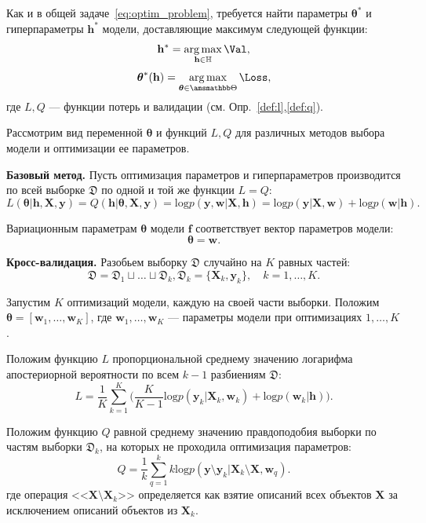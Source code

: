 Как и в общей задаче~\eqref{eq:optim_problem}, 
требуется найти параметры ${\boldsymbol{\theta}}^{*}$ и гиперпараметры $\mathbf{h}^{*}$ модели, доставляющие максимум следующей функции:
\begin{equation}
\label{eq:main}
    \mathbf{h}^{*} = \argmax_{\mathbf{h} \in \mathbb{H}} \Val,
\end{equation}
\begin{equation}
\label{eq:main2}
	\boldsymbol{\theta}^{*}(\mathbf{h}) =  \argmax_{\boldsymbol{\theta} \in \Tetab} \Loss,
\end{equation}
где $L,Q$ --- функции потерь и валидации (см. Опр.~\ref{def:l},\ref{def:q}).

Рассмотрим вид переменной $\boldsymbol{\theta}$ и функций $L, Q$ для различных методов выбора модели и оптимизации ее параметров.

\textbf{Базовый метод. }
Пусть оптимизация параметров и гиперпараметров производится по всей выборке $\mathfrak{D}$ по одной и той же функции $L=Q$:
$$L(\boldsymbol{\theta}|  \mathbf{h},  \mathbf{X}, \mathbf{y}) = Q(\mathbf{h}|  \boldsymbol{\theta}, \mathbf{X}, \mathbf{y} ) = \text{log}p(\mathbf{y}, \mathbf{w} | \mathbf{X}, \mathbf{h}) = \text{log} p(\mathbf{y}|\mathbf{X}, \mathbf{w})+\text{log}p(\mathbf{w}|\mathbf{h}).$$

Вариационным параметрам $\boldsymbol{\theta}$ модели $\mathbf{f}$  соответствует вектор параметров модели: 
\[
\boldsymbol{\theta} = \mathbf{w}.
\]

\textbf{Кросс-валидация. }
Разобьем выборку $\mathfrak{D}$ случайно на $K$ равных частей:
\[
\mathfrak{D} = \mathfrak{D}_1 \sqcup \dots \sqcup \mathfrak{D}_k, \mathfrak{D}_k = \{\mathbf{X}_k, \mathbf{y}_k\}, \quad k=1,\dots,K.
\]


Запустим $K$ оптимизаций модели, каждую на своей части выборки. Положим $\boldsymbol{\theta} = [\mathbf{w}_1, \dots, \mathbf{w}_K]$, где $\mathbf{w}_1, \dots, \mathbf{w}_K$ --- параметры модели при оптимизациях $1, \dots, K$.
 
Положим функцию $L$ пропорциональной  среднему значению логарифма апостериорной вероятности по всем $k-1$ разбиениям $\mathfrak{D}$:
\begin{equation}
L = \frac{1}{K}\sum_{k=1}^K \bigl(\frac{K}{K-1}\text{log}p(\mathbf{y}_k|\mathbf{X}_k, \mathbf{w}_k) + \text{log}p(\mathbf{w}_k|\mathbf{h})\bigr).
\label{eq:cv}
\end{equation}

Положим функцию $Q$ равной среднему значению правдоподобия выборки по частям выборки $\mathfrak{D}_k$, на которых не проходила оптимизация параметров:
\[
Q = \frac{1}{k}\sum_{q=1}^k k\text{log}p(\mathbf{y} \setminus \mathbf{y}_k|\mathbf{X}_k \setminus \mathbf{X}, \mathbf{w}_q).
\]
где операция <<$\mathbf{X} \setminus \mathbf{X}_k$>> определяется как взятие описаний всех объектов $\mathbf{X}$ за исключением описаний объектов из $\mathbf{X}_k$.


